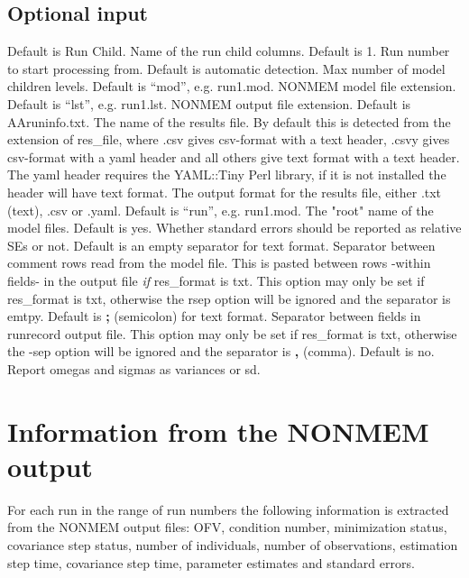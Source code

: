\subsection{Optional input}
\begin{optionlist}
Default is Run Child. Name of the run child columns.
\nextopt
{}
Default is 1. Run number to start processing from.  
\nextopt
{}
Default is automatic detection. Max number of model children levels. 
\nextopt
{}
Default is “mod”, e.g. run1.mod. NONMEM model file extension. 
\nextopt
{}
Default is “lst”, e.g. run1.lst. NONMEM output file extension. 
\nextopt
{}
Default is AAruninfo.txt. The name of the results file.  
\nextopt
{}
By default this is detected from the extension of res\_file, where .csv gives csv-format with a text header, .csvy gives csv-format with a yaml header and all others give text format with a text header.\\ The yaml header requires the YAML::Tiny Perl library, if it is not installed the header will have text format. The output format for the results file, either .txt (text), .csv or .yaml.
\nextopt
{}
Default is “run”, e.g. run1.mod. The "root" name of the model files. 
\nextopt
{}
Default is yes. Whether standard errors should be reported as relative SEs or not. 
\nextopt
{}
Default is an empty separator for text format.	Separator between comment rows read from the model file. This is pasted between rows -within fields- in the output file \emph{if} res\_format is txt. This option may only be set if res\_format is txt, otherwise the rsep option will be ignored and the separator is emtpy. 
\nextopt
{}
Default is \textbf{;} (semicolon) for text format. Separator between fields in runrecord output file. This option may
only be set if res\_format is txt, otherwise the -sep option will be ignored and the separator is \textbf{,} (comma).
\nextopt
{}
Default is no. Report omegas and sigmas as variances or sd.
\nextopt
\end{optionlist}

\section{Information from the NONMEM output}
For each run in the range of run numbers the following information is extracted from the NONMEM output files: OFV, condition number, minimization status, covariance step status, number of individuals, number of observations, estimation step time, covariance step time, parameter estimates and standard errors. 

